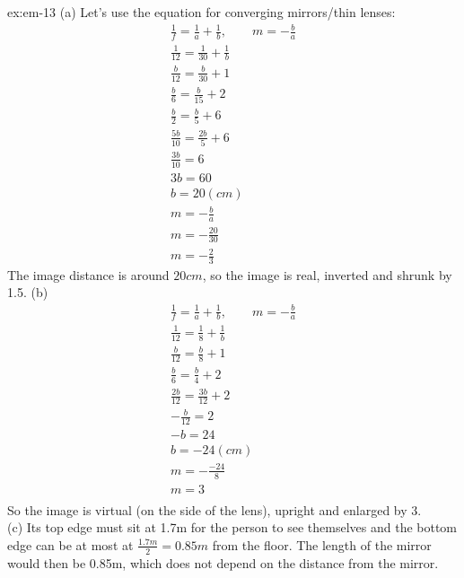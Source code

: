 \begin{solution}{ex:em-13}
  (a) Let's use the equation for converging mirrors/thin lenses:
  \[
    \begin{gathered}
      \frac{1}{f}=\frac{1}{a}+\frac{1}{b}, \qquad m=-\frac{b}{a}\\
      \frac{1}{12}=\frac{1}{30}+\frac{1}{b}\\
      \frac{b}{12}=\frac{b}{30}+1\\
      \frac{b}{6}=\frac{b}{15}+2\\
      \frac{b}{2}=\frac{b}{5}+6\\
      \frac{5b}{10}=\frac{2b}{5}+6\\
      \frac{3b}{10}=6\\
      3b=60\\
      b=20 (cm)\\
      m=-\frac{b}{a}\\
      m=-\frac{20}{30}\\
      m=-\frac{2}{3}
    \end{gathered}
  \]
  The image distance is around $20cm$, so the image is real, inverted and shrunk by 1.5.
  (b)
  \[
    \begin{gathered}
      \frac{1}{f}=\frac{1}{a}+\frac{1}{b}, \qquad m=-\frac{b}{a}\\
      \frac{1}{12}=\frac{1}{8}+\frac{1}{b}\\
      \frac{b}{12}=\frac{b}{8}+1\\
      \frac{b}{6}=\frac{b}{4}+2\\
      \frac{2b}{12}=\frac{3b}{12}+2\\
      -\frac{b}{12}=2\\
      -b=24\\
      b=-24 (cm)\\
      m=-\frac{-24}{8}\\
      m=3\\
    \end{gathered}
  \]
  So the image is virtual (on the side of the lens), upright and enlarged by 3.\\
  (c)
  Its top edge must sit at 1.7m for the person to see themselves and the bottom edge can be at most at $\frac{1.7m}{2}=0.85m$ from the floor. The length of the mirror would then be 0.85m, which does not depend on the distance from the mirror.
\end{solution}
